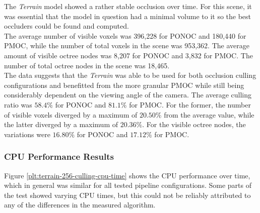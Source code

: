 
\noindent
The \emph{Terrain} model showed a rather stable occlusion over time. For this scene, it was essential that the 
model in question had a minimal volume to it so the best occluders could be found and computed. \\

\noindent
The average number of visible voxels was 396,228 for \ac{PONOC} and 180,440 for \ac{PMOC}, while the number of total 
voxels in the scene was 953,362. The average amount of visible octree nodes was 8,207 for \ac{PONOC} and 3,832 for 
\ac{PMOC}. The number of total octree nodes in the scene was 18,465. \\

\noindent
The data suggests that the \emph{Terrain} was able to be used for both occlusion culling configurations and benefitted from 
the more granular \ac{PMOC} while still being considerably dependent on the viewing angle of the camera. The average 
culling ratio was $58.4\%$ for \ac{PONOC} and $81.1\%$ for \ac{PMOC}. For the former, the number of visible voxels 
diverged by a maximum of $20.50\%$ from the average value, while the latter diverged by a maximum of $20.36\%$. 
For the visible octree nodes, the variations were $16.80\%$ for \ac{PONOC} and $17.12\%$ for \ac{PMOC}.

\subsubsection*{CPU Performance Results} \label{subsubsec-cpu-performance-results-terrain}

Figure \ref{plt:terrain-256-culling-cpu-time} shows the \ac{CPU} performance over time, which in general 
was similar for all tested pipeline configurations. Some parts of the test showed varying \ac{CPU} times, 
but this could not be reliably attributed to any of the differences in the measured algorithm. 

